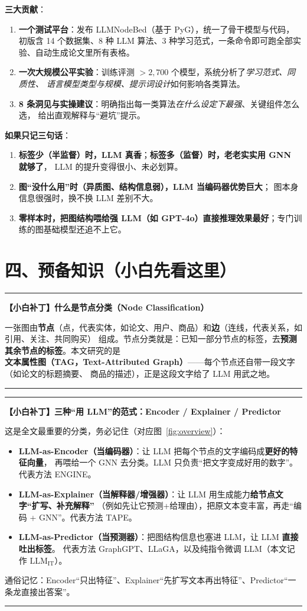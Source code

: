 \documentclass[11pt,UTF8,fontset=fandol]{ctexart}
\newenvironment{tip}[1]{%
  \par\smallskip\noindent\rule{\linewidth}{0.4pt}\par\nobreak
  \noindent\textbf{【小白补丁】#1}\par\nobreak\noindent\ignorespaces
}{%
  \par\noindent\rule{\linewidth}{0.4pt}\par\smallskip
}
\begin{document}
\textbf{三大贡献}：
\begin{enumerate}[leftmargin=2em]
  \item \textbf{一个测试平台}：发布 LLMNodeBed（基于 PyG），统一了骨干模型与代码，
        初版含 14 个数据集、8 种 LLM 算法、3 种学习范式，一条命令即可跑全部实验、自动生成论文里所有表格。
  \item \textbf{一次大规模公平实验}：训练评测 $>2{,}700$ 个模型，系统分析了\emph{学习范式、同质性、
        语言模型类型与规模、提示词设计}如何影响各类算法。
  \item \textbf{8 条洞见与实操建议}：明确指出每一类算法\emph{在什么设定下最强}、关键组件怎么选，
        给出直观解释与“避坑”提示。
\end{enumerate}

\textbf{如果只记三句话}：
\begin{enumerate}[leftmargin=2em]
  \item \textbf{标签少（半监督）时，LLM 真香}；\textbf{标签多（监督）时，老老实实用 GNN 就够了}，
        LLM 的提升变得很小、未必划算。
  \item \textbf{图“没什么用”时（异质图、结构信息弱），LLM 当编码器优势巨大}；
        图本身信息很强时，换不换 LLM 差别不大。
  \item \textbf{零样本时，把图结构喂给强 LLM（如 GPT-4o）直接推理效果最好}；专门训练的图基础模型还追不上它。
\end{enumerate}

\section{四、预备知识（小白先看这里）}

\begin{tip}{什么是节点分类（Node Classification）}
一张图由\textbf{节点}（点，代表实体，如论文、用户、商品）和\textbf{边}（连线，代表关系，如引用、关注、共同购买）
组成。节点分类就是：已知一部分节点的标签，去\textbf{预测其余节点的标签}。本文研究的是
\textbf{文本属性图（TAG，Text-Attributed Graph）}——每个节点还自带一段文字（如论文的标题摘要、
商品的描述），正是这段文字给了 LLM 用武之地。
\end{tip}

\begin{tip}{三种“用 LLM”的范式：Encoder / Explainer / Predictor}
这是全文最重要的分类，务必记住（对应图~\ref{fig:overview}）：
\begin{itemize}[leftmargin=1.4em]
  \item \textbf{LLM-as-Encoder（当编码器）}：让 LLM 把每个节点的文字编码成\textbf{更好的特征向量}，
        再喂给一个 GNN 去分类。LLM 只负责“把文字变成好用的数字”。代表方法 ENGINE。
  \item \textbf{LLM-as-Explainer（当解释器/增强器）}：让 LLM 用生成能力\textbf{给节点文字“扩写、补充解释”}
        （例如先让它预测+给理由），把原文本变丰富，再走“编码 + GNN”。代表方法 TAPE。
  \item \textbf{LLM-as-Predictor（当预测器）}：把图结构信息也塞进 LLM，让 LLM \textbf{直接吐出标签}。
        代表方法 GraphGPT、LLaGA，以及纯指令微调 LLM（本文记作 $\mathrm{LLM_{IT}}$）。
\end{itemize}
通俗记忆：Encoder“只出特征”、Explainer“先扩写文本再出特征”、Predictor“一条龙直接出答案”。
\end{tip}
\end{document}
